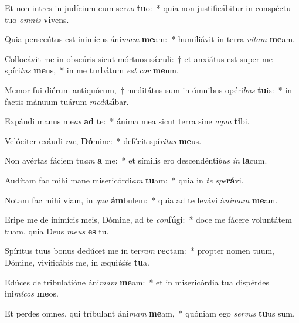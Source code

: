 \item Et non intres in judícium cum ser\textit{vo} \textbf{tu}o:~* quia non justificábitur in conspéctu tuo \textit{om}\textit{nis} \textbf{vi}vens.
\item Quia persecútus est inimícus áni\textit{mam} \textbf{me}am:~* humiliávit in terra \textit{vi}\textit{tam} \textbf{me}am.
\item Collocávit me in obscúris sicut mórtuos sǽculi:~† et anxiátus est super me spíri\textit{tus} \textbf{me}us,~* in me turbátum \textit{est} \textit{cor} \textbf{me}um.
\item Memor fui diérum antiquórum,~† meditátus sum in ómnibus opéri\textit{bus} \textbf{tu}is:~* in factis mánuum tuárum \textit{me}\textit{di}\textbf{tá}bar.
\item Expándi manus me\textit{as} \textbf{ad} te:~* ánima mea sicut terra sine \textit{a}\textit{qua} \textbf{ti}bi.
\item Velóciter exáudi \textit{me}, \textbf{Dó}mine:~* defécit spí\textit{ri}\textit{tus} \textbf{me}us.
\item Non avértas fáciem tu\textit{am} \textbf{a} me:~* et símilis ero descendénti\textit{bus} \textit{in} \textbf{la}cum.
\item Audítam fac mihi mane misericórdi\textit{am} \textbf{tu}am:~* quia in \textit{te} \textit{spe}\textbf{rá}vi.
\item Notam fac mihi viam, in \textit{qua} \textbf{ám}bulem:~* quia ad te levávi á\textit{ni}\textit{mam} \textbf{me}am.
\item Eripe me de inimícis meis, Dómine, ad te \textit{con}\textbf{fú}gi:~* doce me fácere voluntátem tuam, quia Deus \textit{me}\textit{us} \textbf{es} tu.
\item Spíritus tuus bonus dedúcet me in ter\textit{ram} \textbf{rec}tam:~* propter nomen tuum, Dómine, vivificábis me, in æqui\textit{tá}\textit{te} \textbf{tu}a.
\item Edúces de tribulatióne áni\textit{mam} \textbf{me}am:~* et in misericórdia tua dispérdes ini\textit{mí}\textit{cos} \textbf{me}os.
\item Et perdes omnes, qui tríbulant áni\textit{mam} \textbf{me}am,~* quóniam ego \textit{ser}\textit{vus} \textbf{tu}us sum.
